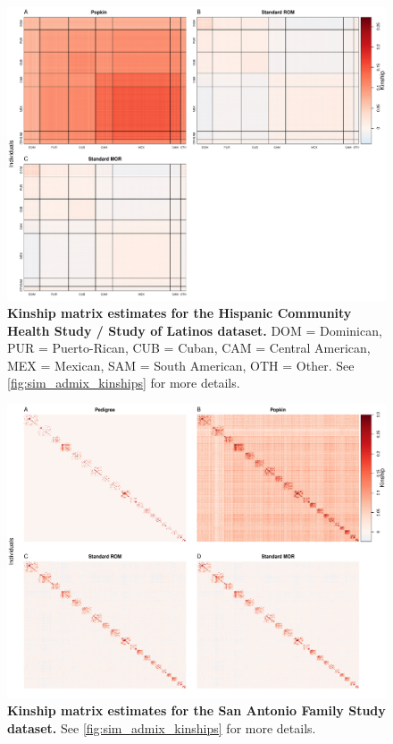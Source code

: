 \documentclass[11pt]{article}
\begin{document}
\begin{figure}[bp!]
  \centering
  \includegraphics[width=\textwidth]{data/SFig_HCHS_All_maf001_kinships.pdf}
  \caption{
    {\bf Kinship matrix estimates for the Hispanic Community Health Study / Study of Latinos dataset.} DOM = Dominican, PUR = Puerto-Rican, CUB = Cuban, CAM = Central American, MEX = Mexican, SAM = South American, OTH = Other.
    See \cref{fig:sim_admix_kinships} for more details.
    }
  \label{fig:HCHS_kinships}
\end{figure}

\begin{figure}[bp!]
  \centering
  \includegraphics[width=\textwidth]{data/SFig_T2D_kinships.pdf}
  \caption{
    {\bf Kinship matrix estimates for the San Antonio Family
Study dataset.}
    See \cref{fig:sim_admix_kinships} for more details.
    }
  \label{fig:T2D_kinships}
\end{figure}
\end{document}
